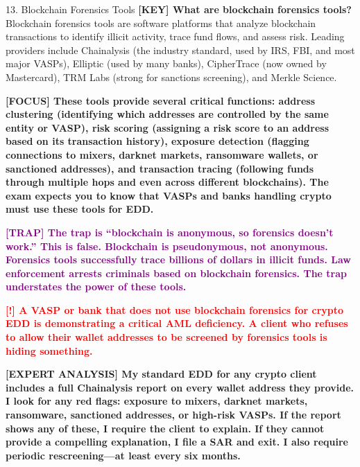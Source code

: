 \documentclass[11pt,a4paper]{beamer}
\newcommand{\redflag}[1]{\textcolor{red}{\textbf{[!] #1}}}
\newcommand{\examfocus}[1]{\textcolor{orange!80!black}{\textbf{[FOCUS] #1}}}
\newcommand{\trap}[1]{\textcolor{purple}{\textbf{[TRAP] #1}}}
\newcommand{\keyterm}[1]{\textcolor{red!80!black}{\textbf{[KEY] #1}}}
\newcommand{\expert}[1]{\textcolor{blue!70!black}{\textbf{[EXPERT ANALYSIS] #1}}}
\begin{document}
	\begin{frame}{13. Blockchain Forensics Tools}
		\tiny
		\keyterm{What are blockchain forensics tools?} Blockchain forensics tools are software platforms that analyze blockchain transactions to identify illicit activity, trace fund flows, and assess risk. Leading providers include Chainalysis (the industry standard, used by IRS, FBI, and most major VASPs), Elliptic (used by many banks), CipherTrace (now owned by Mastercard), TRM Labs (strong for sanctions screening), and Merkle Science.
		
		\vspace{0.1cm}
		\examfocus{These tools provide several critical functions: address clustering (identifying which addresses are controlled by the same entity or VASP), risk scoring (assigning a risk score to an address based on its transaction history), exposure detection (flagging connections to mixers, darknet markets, ransomware wallets, or sanctioned addresses), and transaction tracing (following funds through multiple hops and even across different blockchains). The exam expects you to know that VASPs and banks handling crypto must use these tools for EDD.}
		
		\vspace{0.1cm}
		\trap{The trap is “blockchain is anonymous, so forensics doesn't work.” This is false. Blockchain is pseudonymous, not anonymous. Forensics tools successfully trace billions of dollars in illicit funds. Law enforcement arrests criminals based on blockchain forensics. The trap understates the power of these tools.}
		
		\vspace{0.1cm}
		\redflag{A VASP or bank that does not use blockchain forensics for crypto EDD is demonstrating a critical AML deficiency. A client who refuses to allow their wallet addresses to be screened by forensics tools is hiding something.}
		
		\vspace{0.1cm}
		\expert{My standard EDD for any crypto client includes a full Chainalysis report on every wallet address they provide. I look for any red flags: exposure to mixers, darknet markets, ransomware, sanctioned addresses, or high-risk VASPs. If the report shows any of these, I require the client to explain. If they cannot provide a compelling explanation, I file a SAR and exit. I also require periodic rescreening—at least every six months.}
	\end{frame}
	
\end{document}
